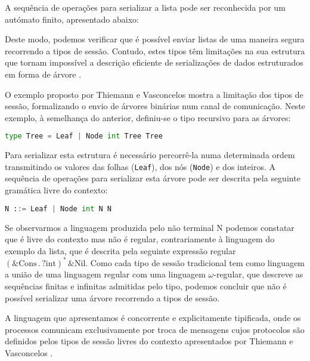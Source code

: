 A sequência de operações para serializar a lista pode ser reconhecida por um autómato finito, apresentado abaixo:



Deste modo, podemos verificar que é possível enviar listas de uma maneira segura recorrendo a tipos de sessão. Contudo, estes tipos têm limitações na sua estrutura que tornam impossível a descrição eficiente de serializações de dados estruturados em forma de árvore \cite{ref-cfst}.

O exemplo proposto por Thiemann e Vasconcelos \cite{ref-cfst}
mostra a limitação dos tipos de sessão, formalizando o envio de árvores binárias num canal de comunicação. Neste exemplo, à semelhança do anterior, definiu-se o tipo recursivo para as árvores:
\begin{lstlisting}[language=Python]
	type Tree = Leaf | Node int Tree Tree
\end{lstlisting}
Para serializar esta estrutura é necessário percorrê-la numa determinada ordem transmitindo os valores das folhas (\lstinline"Leaf"), dos nós (\lstinline"Node") e dos inteiros. A sequência de operações para serializar esta árvore pode ser descrita pela seguinte gramática livre do contexto:
\begin{lstlisting}[language=Python]
	N ::= Leaf | Node int N N
\end{lstlisting}
Se observarmos a linguagem produzida pelo não terminal N podemos constatar que é livre do contexto mas não é regular, contrariamente à linguagem do exemplo da lista, que é descrita pela seguinte expressão regular $(\&\mbox{Cons}\,.\,?\mbox{int})^{*}\,\&\mbox{Nil}$. Como cada tipo de sessão tradicional tem como linguagem a união de uma linguagem regular com uma linguagem $\omega$-regular, que descreve as sequências finitas e infinitas admitidas pelo tipo, podemos concluir que não é possível serializar uma árvore recorrendo a tipos de sessão.

A linguagem que apresentamos é concorrente e explicitamente tipificada, onde os processos comunicam exclusivamente por troca de mensagens cujos protocolos são definidos pelos tipos de sessão livres do contexto apresentados por Thiemann e Vasconcelos \cite{ref-cfst}.


